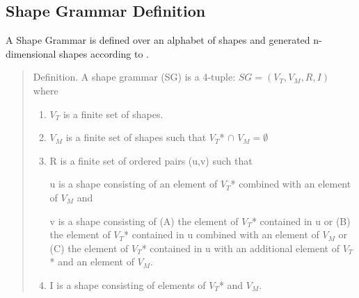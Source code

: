 \subsection{Shape Grammar Definition}
\label{sec:Shape_Grammar_Definition}
A Shape Grammar is defined over an alphabet of shapes and generated n-dimensional shapes according to \citep{shapeGrammars:1972}.
\begin{quote} 
    Definition. A shape grammar (SG) is a 4-tuple: $SG = (V_T, V_M, R, I)$ where
    \begin{enumerate}
        \item $V_T$ is a finite set of shapes.
        \item $V_M$ is a finite set of shapes such that $V_T $* $\cap$  $V_M = \emptyset$
        \item R is a finite set of ordered pairs (u,v) such that
        
        u is a shape consisting of an element of $V_T $* combined with an element of $V_M$ and
        
        v is a shape consisting of (A) the element of $V_T $* contained in u or (B) the element of $V_T $* contained in u combined with an element of $V_M$ or (C) the element of $V_T $* contained in u with an additional element of $V_T$* and an element of $V_M$.
        
        \item I is a shape consisting of elements of $V_T $* and $V_M$.
    \end{enumerate}
\end{quote}

